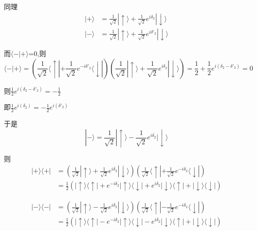 \documentclass[lang=cn,10pt]{elegantbook}
\begin{document}
 同理
 \begin{equation*}
 	\begin{split}
 		|+\rangle &=\frac{1}{\sqrt{2}}|\uparrow \rangle +\frac{1}{\sqrt{2}}e^{i\delta _2}|\downarrow \rangle 
 		\\
 		|-\rangle &=\frac{1}{\sqrt{2}}|\uparrow \rangle +\frac{1}{\sqrt{2}}e^{i\delta' _2}|\downarrow \rangle 
 	\end{split}
 \end{equation*}
 
 而$\langle -|+\rangle$=0,则
 \begin{equation*}
 	\langle -|+\rangle=\left( \frac{1}{\sqrt{2}}\langle\uparrow |+\frac{1}{\sqrt{2}}e^{-i\delta' _2}\langle\downarrow | \right) \left( \frac{1}{\sqrt{2}}|\uparrow \rangle +\frac{1}{\sqrt{2}}e^{i\delta _2}|\downarrow \rangle \right) =\frac{1}{2}+\frac{1}{2}e^{i\left( \delta _2-\delta' _2 \right)}=0
 \end{equation*}
 
 则$\frac{1}{2}e^{i\left( \delta _2-\delta' _2 \right)}=-\frac{1}{2}$
 
 即$\frac{1}{2}e^{i\left( \delta _2 \right)}=-\frac{1}{2}e^{i\left( \delta' _2 \right)}$
 
 于是
 \begin{equation*}
 	|-\rangle =\frac{1}{\sqrt{2}}|\uparrow \rangle -\frac{1}{\sqrt{2}}e^{i\delta _2}|\downarrow \rangle
 \end{equation*}
 
 则\begin{equation*}
 	\begin{split}
 		|+\rangle \langle +|&=\left( \frac{1}{\sqrt{2}}|\uparrow \rangle +\frac{1}{\sqrt{2}}e^{i\delta _2}|\downarrow \rangle \right) \left( \frac{1}{\sqrt{2}}\langle\uparrow |+\frac{1}{\sqrt{2}}e^{-i\delta _2}\langle\downarrow | \right) 
 		\\
 		&=\frac{1}{2}\left( |\uparrow \rangle \langle \uparrow |+e^{-i\delta _2}|\uparrow \rangle \langle \downarrow |+e^{i\delta _2}|\downarrow \rangle \langle \uparrow |+|\downarrow \rangle \langle \downarrow | \right) 
 	\end{split}
 \end{equation*}
 
 \begin{equation*}
 	\begin{split}
 		|-\rangle \langle -|&=\left( \frac{1}{\sqrt{2}}|\uparrow \rangle -\frac{1}{\sqrt{2}}e^{i\delta _2}|\downarrow \rangle \right) \left( \frac{1}{\sqrt{2}}\langle\uparrow |-\frac{1}{\sqrt{2}}e^{-i\delta _2}\langle\downarrow | \right) 
 		\\
 		&=\frac{1}{2}\left( |\uparrow \rangle \langle \uparrow |-e^{-i\delta _2}|\uparrow \rangle \langle \downarrow |-e^{i\delta _2}|\downarrow \rangle \langle \uparrow |+|\downarrow \rangle \langle \downarrow | \right) 
 	\end{split}
 \end{equation*}
 
\end{document}
